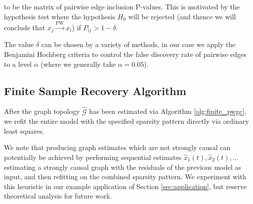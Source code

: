 \documentclass[12pt]{article}
\def\pwgc{\overset{\text{PW}}{\rightarrow}}  %
\def\gcg{\mathcal{G}}  %
\begin{document}
to be the matrix of pairwise edge inclusion P-values.  This is
motivated by the hypothesis test where the hypothesis $H_0$ will be
rejected (and thence we will conclude that $x_j \pwgc x_i$) if
$P_{ij} > 1 - \delta$.

The value $\delta$ can be chosen by a variety of methods, in our case
we apply the Benjamini Hochberg criteria \cite{benjamini_hochberg}
\cite{all_of_statistics} to control the false discovery rate of
pairwise edges to a level $\alpha$ (where we generally take
$\alpha = 0.05$).

\subsection{Finite Sample Recovery Algorithm}
\label{sec:finite_pwgc}

After the graph topology $\widehat{\gcg}$ has been estimated via
Algorithm \ref{alg:finite_pwgc}, we refit the entire model with the
specified sparsity pattern directly via ordinary least squares.

We note that producing graph estimates which are not strongly causal
can potentially be achieved by performing sequential estimates
$\widehat{x}_1(t), \widehat{x}_2(t), \ldots$ estimating a strongly causal
graph with the residuals of the previous model as input, and then
refitting on the combined sparsity pattern.  We experiment with this
heuristic in our example application of Section \ref{sec:application},
but reserve theoretical analysis for future work.

\clearpage
\printbibliography  
\end{document}
